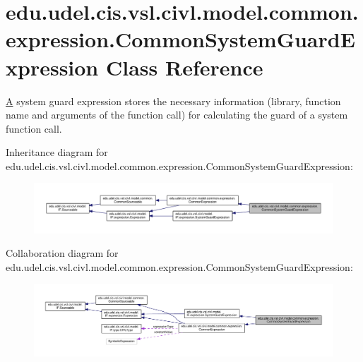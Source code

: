 \hypertarget{classedu_1_1udel_1_1cis_1_1vsl_1_1civl_1_1model_1_1common_1_1expression_1_1CommonSystemGuardExpression}{}\section{edu.\+udel.\+cis.\+vsl.\+civl.\+model.\+common.\+expression.\+Common\+System\+Guard\+Expression Class Reference}
\label{classedu_1_1udel_1_1cis_1_1vsl_1_1civl_1_1model_1_1common_1_1expression_1_1CommonSystemGuardExpression}


\hyperlink{structA}{A} system guard expression stores the necessary information (library, function name and arguments of the function call) for calculating the guard of a system function call.  




Inheritance diagram for edu.\+udel.\+cis.\+vsl.\+civl.\+model.\+common.\+expression.\+Common\+System\+Guard\+Expression\+:
\nopagebreak
\begin{figure}[H]
\begin{center}
\leavevmode
\includegraphics[width=350pt]{classedu_1_1udel_1_1cis_1_1vsl_1_1civl_1_1model_1_1common_1_1expression_1_1CommonSystemGuardExpression__inherit__graph}
\end{center}
\end{figure}


Collaboration diagram for edu.\+udel.\+cis.\+vsl.\+civl.\+model.\+common.\+expression.\+Common\+System\+Guard\+Expression\+:
\nopagebreak
\begin{figure}[H]
\begin{center}
\leavevmode
\includegraphics[width=350pt]{classedu_1_1udel_1_1cis_1_1vsl_1_1civl_1_1model_1_1common_1_1expression_1_1CommonSystemGuardExpression__coll__graph}
\end{center}
\end{figure}
